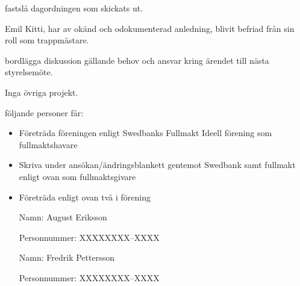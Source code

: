 \documentclass{protokoll}
\begin{document}
\newpage  


\begin{beslut}
     \att fastslå dagordningen som skickats ut.
\end{beslut}

Emil Kitti, har av okänd och odokumenterad anledning, blivit befriad från sin roll som trappmästare. 
\begin{beslut}
    \att bordlägga diskussion gällande behov och ansvar kring ärendet till nästa styrelsemöte.
\end{beslut}
Inga övriga projekt.

\begin{beslut}
    \att följande personer får:
    \begin{itemize}
        \item Företräda föreningen enligt Swedbanks Fullmakt Ideell förening som fullmaktshavare
        \item Skriva under ansökan/ändringsblankett gentemot Swedbank samt fullmakt enligt ovan som fullmaktsgivare
        \item Företräda enligt ovan två i förening
    \end{itemize}
    \begin{itemize}
        \item[Namn: ] August Eriksson
        \item[Personnummer: ] XXXXXXXX--XXXX

        \item[Namn: ] Fredrik Pettersson
        \item[Personnummer: ] XXXXXXXX--XXXX
    \end{itemize}
\end{beslut}
\end{document}
